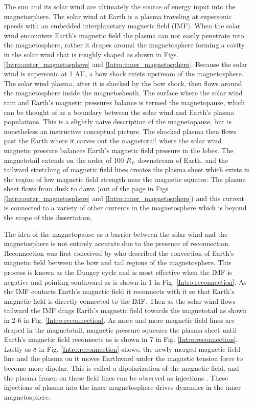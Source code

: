 The sun and its solar wind are ultimately the source of energy input into the magnetosphere. The solar wind at Earth is a plasma traveling at supersonic speeds with an embedded interplanetary magnetic field (IMF). When the solar wind encounters Earth's magnetic field the plasma can not easily penetrate into the magnetosphere, rather it drapes around the magnetosphere forming a cavity in the solar wind that is roughly shaped as shown in Figs. \ref{Intro:outer_magnetosphere} and \ref{Intro:inner_magnetosphere}. Because the solar wind is supersonic at 1 AU, a bow shock exists upstream of the magnetosphere. The solar wind plasma, after it is shocked by the bow shock, then flows around the magnetosphere inside the magnetosheath. The surface where the solar wind ram and Earth's magnetic pressures balance is termed the magnetopause, which can be thought of as a boundary between the solar wind and Earth's plasma populations. This is a slightly naive description of the magnetopause, but is nonetheless an instructive conceptual picture. The shocked plasma then flows past the Earth where it carves out the magnetotail where the solar wind magnetic pressure balances Earth's magnetic field pressure in the lobes. The magnetotail extends on the order of 100 $R_E$ downstream of Earth, and the tailward stretching of magnetic field lines creates the plasma sheet which exists in the region of low magnetic field strength near the magnetic equator. The plasma sheet flows from dusk to dawn (out of the page in Figs. \ref{Intro:outer_magnetosphere} and \ref{Intro:inner_magnetosphere}) and this current is connected to a variety of other currents in the magnetosphere which is beyond the scope of this dissertation.

The idea of the magnetopause as a barrier between the solar wind and the magnetosphere is not entirely accurate due to the presence of reconnection. Reconnection was first conceived by \citet{Dungey1961} who described the convection of Earth's magnetic field between the bow and tail regions of the magnetosphere. This process is known as the Dungey cycle and is most effective when the IMF is negative and pointing southward as is shown in 1 in Fig. \ref{Intro:reconnection}. As the IMF contacts Earth's magnetic field it reconnects with it so that Earth's magnetic field is directly connected to the IMF. Then as the solar wind flows tailward the IMF drags Earth's magnetic field towards the magnetotail as shown in 2-6 in Fig. \ref{Intro:reconnection}. As more and more magnetic field lines are draped in the magnetotail, magnetic pressure squeezes the plasma sheet until Earth's magnetic field reconnects as is shown in 7 in Fig. \ref{Intro:reconnection}. Lastly as 8 in Fig. \ref{Intro:reconnection} shows, the newly merged magnetic field line and the plasma on it moves Earthward under the magnetic tension force to become more dipolar. This is called a dipolarization of the magnetic field, and the plasma frozen on these field lines can be observed as injections \citep[e.g.][]{Turner2015}. These injections of plasma into the inner magnetosphere drives dynamics in the inner magnetosphere.

